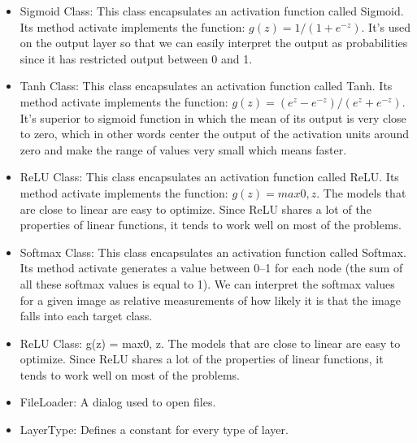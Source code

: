 \documentclass[parskip=full]{scrartcl}
\begin{document}
\pagebreak



\begin{itemize}
	\item Sigmoid Class: This class encapsulates an activation function called Sigmoid. Its method activate implements the function: $g(z) = 1 / (1 + e^{-z})$. It’s used on the output layer so that we can easily interpret the output as probabilities since it has restricted output between 0 and 1.
	\item Tanh Class: This class encapsulates an activation function called Tanh. Its method activate implements the function: $g(z) = (e^z -e^{-z}) / (e^z + e^{-z})$. It’s superior to sigmoid function in which the mean of its output is very close to zero, which in other words center the output of the activation units around zero and make the range of values very small which means faster.
	\item ReLU Class: This class encapsulates an activation function called ReLU. Its method activate implements the function: $g(z) = max{0, z}$. The models that are close to linear are easy to optimize. Since ReLU shares a lot of the properties of linear functions, it tends to work well on most of the problems.
	\item Softmax Class: This class encapsulates an activation function called Softmax. Its method activate generates a value between 0–1 for each node (the sum of all these softmax values is equal to 1). We can interpret the softmax values for a given image as relative measurements of how likely it is that the image falls into each target class.
	\item ReLU Class:  g(z) = max{0, z}. The models that are close to linear are easy to optimize. Since ReLU shares a lot of the properties of linear functions, it tends to work well on most of the problems.
	\item FileLoader: A dialog used to open files.
	\item LayerType: Defines a constant for every type of layer.
\end{itemize}



\pagebreak
\end{document}
